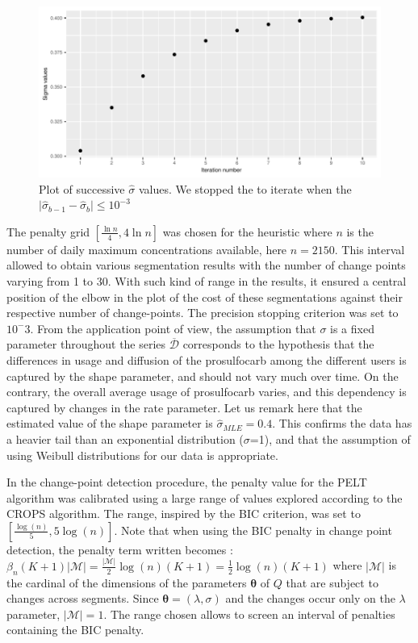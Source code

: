 \begin{figure}[htbp]
  \centering
  \includegraphics[]{figs/Chap5/Sigma_heu.pdf}
  \caption{Plot of successive $\widehat{\sigma}$ values. We stopped the to iterate when the $\lvert \widehat{\sigma}_{b-1} - \widehat{\sigma}_{b} \rvert \leq 10^{-3}$}
  \label{fig:sig}
\end{figure}

The penalty grid $[\frac{\ln n}{4},4\ln n]$ was chosen for the heuristic where $n$ is the number of daily maximum concentrations available, here $n = 2150$. This interval allowed to obtain various segmentation results with the number of change points varying from 1 to 30. With such kind of range in the results, it ensured a central position of the elbow in the plot of the cost of these segmentations against their respective number of change-points. The precision stopping criterion was set to $10^-3$.
From the application point of view, the assumption that $\sigma$ is a fixed parameter throughout the series $\overline{\mathcal{D}}$ corresponds to the hypothesis that the differences in usage and diffusion of the prosulfocarb among the different users is captured by the shape parameter, and should not vary much over time. On the contrary, the overall average usage of prosulfocarb varies, and this dependency is captured by changes in the rate parameter. Let us remark here that the estimated value of the shape parameter is $\hat \sigma_{MLE}=0.4$. This confirms the data has a heavier tail than an exponential distribution ($\sigma$=1), and that the assumption of using Weibull distributions for our data is appropriate. 


In the change-point detection procedure, the penalty value for the PELT algorithm was calibrated using a large range of values explored according to the CROPS algorithm. The range, inspired by the BIC criterion, was set to $[\frac{\log(n)}{5},5\log(n)]$. Note that when using the BIC penalty in change point detection, the penalty term written becomes : $\beta_n(K+1)|\mathcal{M}| = \frac{|\mathcal{M}|}{2}\log(n)(K+1) = \frac{1}{2}\log(n)(K+1)$ where $|\mathcal{M}|$ is the cardinal of the dimensions of the parameters $\bm\theta$ of $Q$ that are subject to changes across segments. Since $\bm\theta = (\lambda,\sigma)$ and the changes occur only on the $\lambda$ parameter, $|\mathcal{M}| = 1$. The range chosen allows to screen an interval of penalties containing the BIC penalty.


